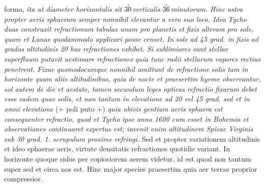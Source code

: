 forma, \textit{ita ut diameter horizontalis sit $30\hspace{-6pt}\raisebox{9pt}{,}$ verticalis
 $\vspace{1cm}36\hspace{-6pt}\raisebox{9pt}{,}$ minutorum. Hinc astra propter aeris sphaeram semper nonnihil elevantur a vero suo loco. Ideo }\textit{Tycho}\protect{}\textit{ duas construxit refractionum tabulas unam pro }\textit{planetis}\protect{}\textit{ et }\textit{fixis}\protect{}\textit{ alteram pro sole, quam et }\textit{Lunae}\protect{}\textit{ quodammodo applicari posse censet. In }\textit{sole}\protect{}\textit{ ad 45 grad. in }\textit{fixis}\protect{}\textit{ ad gradus altitudinis 20 has }\textit{refractiones}\protect{}\textit{ exhibet. Si sublimiores sunt }\textit{stellae}\protect{}\textit{ superfluum putavit aestimare }\textit{refractiones}\protect{}\textit{ quia tunc radii }\textit{stellarum}\protect{}\textit{ vapores rectius penetrent. }\textit{Fixae}\protect{}\textit{ quomodocumque nonnihil amittunt de }\textit{refractione}\protect{}\textit{ }\textit{solis}\protect{}\textit{ tam in horizonte quam aliis altitudinibus, quia de nocte et praesertim hyeme observantur, }\textit{sol}\protect{}\textit{ autem de die et aestate, tamen secundum leges opticas }\textit{refractio}\protect{}\textit{ }\textit{fixarum}\protect{}\textit{ debet esse eadem quae }\textit{solis}\protect{}\textit{, et non tantum in elevatione ad 20 vel 45 grad. sed et in omni elevatione} (+ poli\protect{} puto +) \textit{quia ubivis gentium }\textit{aeris sphaera}\protect{}\textit{ est consequenter }\textit{refractio}\protect{}\textit{, quod et }\textit{Tycho}\protect{}\textit{ ipse anno 1600 cum esset in }\textit{Bohemia}\protect{}\textit{ et observationes continuaret expertus est; invenit enim altitudinem Spicae Virginis}\protect{}\textit{ sub 30 grad. 1. scrupulum proxime refringi.} Sed et propter variationem altitudinis et ideo sphaerae aeris\protect{}, virtute densitatis refractiones\protect{} quotidie variant. In horizonte quoque sidus per copiosiorem aerem videtur, id est quod non tantum super sed et circa nos est. Hinc major species praesertim quia aer terrae\protect{} proprior compressior. 
 \pend
